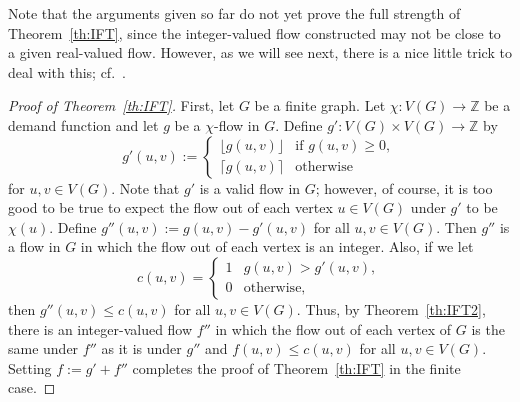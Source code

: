 \documentclass[12pt,a4paper]{amsart}
\numberwithin{equation}{section}
\theoremstyle{definition}
\begin{document}
Note that the arguments given so far do not yet prove the full strength of Theorem~\ref{th:IFT}, since the integer-valued flow constructed may not be close to a given real-valued flow. However, as we will see next, there is a nice little trick to deal with this; cf.~\cite[Corollary~5.2]{MarksUnger17}. 

\begin{proof}[Proof of Theorem~\ref{th:IFT}]
First, let $G$ be a finite graph. Let $\chi:V(G)\to \mathbb{Z}$ be a demand function and let $g$ be a $\chi$-flow in $G$. Define $g':V(G)\times V(G)\to \mathbb{Z}$ by
\[g'(u,v):=\begin{cases}\lfloor g(u,v)\rfloor&\text{if }g(u,v)\geq0,\\
\lceil g(u,v)\rceil & \text{otherwise}\end{cases}\]
for $u,v\in V(G)$. Note that $g'$ is a valid flow in $G$; however, of course, it is too good to be true to expect the flow out of each vertex $u\in V(G)$ under $g'$ to be $\chi(u)$. Define $g''(u,v):=g(u,v)-g'(u,v)$ for all $u,v\in V(G)$. Then $g''$ is a flow in $G$ in which the flow out of each vertex is an integer. Also, if we let 
\[c(u,v)=\begin{cases}1 &g(u,v)>g'(u,v),\\
0 &\text{otherwise},\end{cases}\]
then $g''(u,v)\leq c(u,v)$ for all $u,v\in V(G)$. Thus, by Theorem~\ref{th:IFT2}, there is an integer-valued flow $f''$ in which the flow out of each vertex of $G$ is the same under $f''$ as it is under $g''$ and $f(u,v)\leq c(u,v)$ for all $u,v\in V(G)$. Setting $f:=g'+f''$ completes the proof of Theorem~\ref{th:IFT} in the finite case. 


\end{proof}
\end{document}
